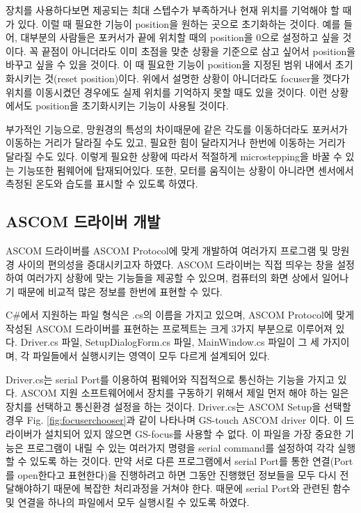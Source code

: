 장치를 사용하다보면 제공되는 최대 스텝수가 부족하거나 현재 위치를 기억해야 할 때가 있다. 이럴 때 필요한 기능이 position을 원하는 곳으로 초기화하는 것이다. 예를 들어, 대부분의 사람들은 포커서가 끝에 위치할 때의 position을 0으로 설정하고 싶을 것이다. 꼭 끝점이 아니더라도 이미 초점을 맞춘 상황을 기준으로 삼고 싶어서 position을 바꾸고 싶을 수 있을 것이다. 이 때 필요한 기능이 position을 지정된 범위 내에서 초기화시키는 것(reset position)이다. 위에서 설명한 상황이 아니더라도 focuser을 껏다가 위치를 이동시켰던 경우에도 실제 위치를 기억하지 못할 때도 있을 것이다. 이런 상황에서도 position을 초기화시키는 기능이 사용될 것이다.

부가적인 기능으로, 망원경의 특성의 차이때문에 같은 각도를 이동하더라도 포커서가 이동하는 거리가 달라질 수도 있고, 필요한 힘이 달라지거나 한번에 이동하는 거리가 달라질 수도 있다. 이렇게 필요한 상황에 따라서 적절하게 microstepping을 바꿀 수 있는 기능또한 펌웨어에 탑재되어있다. 또한, 모터를 움직이는 상황이 아니라면 센서에서 측정된 온도와 습도를 표시할 수 있도록 하였다.

\subsection{ASCOM 드라이버 개발}

ASCOM 드라이버를 ASCOM Protocol에 맞게 개발하여 여러가지 프로그램 및 망원경 사이의 편의성을 증대시키고자 하였다. ASCOM 드라이버는 직접 띄우는 창을 설정하여 여러가지 상황에 맞는 기능들을 제공할 수 있으며, 컴퓨터의 화면 상에서 일어나기 때문에 비교적 많은 정보를 한번에 표현할 수 있다.

C\#에서 지원하는 파일 형식은 .cs의 이름을 가지고 있으며, ASCOM Protocol에 맞게 작성된 ASCOM 드라이버를 표현하는 프로젝트는 크게 3가지 부분으로 이루어져 있다. Driver.cs 파일, SetupDialogForm.cs 파일, MainWindow.cs 파일이 그 세 가지이며, 각 파일들에서 실행시키는 영역이 모두 다르게 설계되어 있다.

Driver.cs는 serial Port를 이용하여 펌웨어와 직접적으로 통신하는 기능을 가지고 있다. ASCOM 지원 소프트웨어에서 장치를 구동하기 위해서 제일 먼저 해야 하는 일은 장치를 선택하고 통신환경 설정을 하는 것이다. Driver.cs는 ASCOM Setup을 선택할 경우 Fig. \ref{fig:focuserchooser}과 같이 나타나며 GS-touch ASCOM driver 이다. 이 드라이버가 설치되어 있지 않으면 GS-focus를 사용할 수 없다. 이 파일을 가장 중요한 기능은 프로그램이 내릴 수 있는 여러가지 명령을 serial command를 설정하여 각각 실행할 수 있도록 하는 것이다. 만약 서로 다른 프로그램에서 serial Port를 통한 연결(Port를 open한다고 표현한다)을 진행하려고 하면 그동안 진행했던 정보들을 모두 다시 전달해야하기 때문에 복잡한 처리과정을 거쳐야 한다. 때문에 serial Port와 관련된 함수 및 연결을 하나의 파일에서 모두 실행시킬 수 있도록 하였다.

